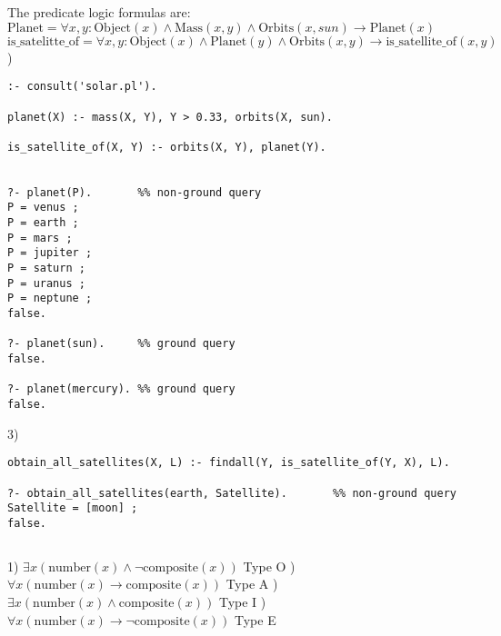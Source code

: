 \documentclass{article}
\begin{document}
The predicate logic formulas are: \newline\newline
$\text{Planet} = \forall x,y : \text{Object}(x) \land \text{Mass}(x,y) \land \text{Orbits}(x,sun) \rightarrow \text{Planet}(x)$
\newline\newline
$\text{is\_satelitte\_of} = \forall x,y : \text{Object}(x) \land \text{Planet}(y) \land \text{Orbits}(x,y) \rightarrow \text{is\_satellite\_of}(x,y)$ \newline{})\newline\newline
\begin{verbatim}
:- consult('solar.pl').

planet(X) :- mass(X, Y), Y > 0.33, orbits(X, sun).

is_satellite_of(X, Y) :- orbits(X, Y), planet(Y).


?- planet(P).       %% non-ground query
P = venus ;
P = earth ;
P = mars ;
P = jupiter ;
P = saturn ;
P = uranus ;
P = neptune ;
false.

?- planet(sun).     %% ground query
false.

?- planet(mercury). %% ground query
false.
\end{verbatim}
3)
\begin{verbatim}
obtain_all_satellites(X, L) :- findall(Y, is_satellite_of(Y, X), L).

?- obtain_all_satellites(earth, Satellite).       %% non-ground query
Satellite = [moon] ;
false.
\end{verbatim}
\subsection{}
1) \newline\newline
$\exists x (\text{number}(x) \land \neg \text{composite}(x))$  \hspace{1cm}  Type \hspace{1mm} O
\newline{}) \newline\newline
$\forall x (\text{number}(x) \rightarrow \text{composite}(x))$ \hspace{1cm}  Type \hspace{1mm} A
\newline{}) \newline\newline
$\exists x (\text{number}(x) \land \text{composite}(x))$  \hspace{1cm}  Type \hspace{1mm} I
\newline{}) \newline\newline
$\forall x (\text{number}(x) \rightarrow \neg \text{composite}(x))$ \hspace{0.7cm} Type \hspace{1mm} E
\end{document}
